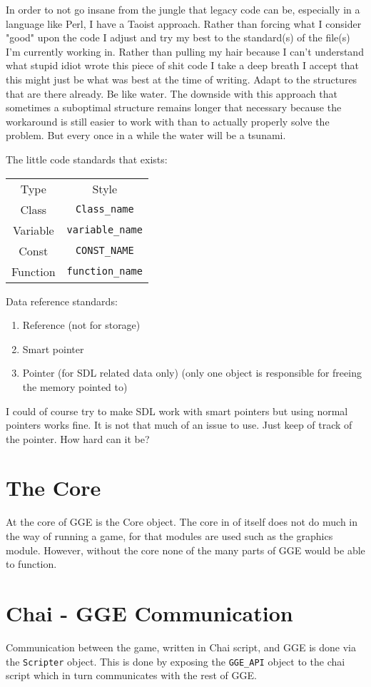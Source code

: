 \documentclass{article}
\begin{document}
In order to not go insane from the jungle that legacy code can be, especially in a language like Perl, I have a Taoist approach.
Rather than forcing what I consider "good" upon the code I adjust and try my best to the standard(s) of the file(s) I'm currently working in.
Rather than pulling my hair because I can't understand what stupid idiot wrote this piece of shit code I take a deep breath I accept that this might just be what was best at the time of writing. 
Adapt to the structures that are there already.
Be like water.
The downside with this approach that sometimes a suboptimal structure remains longer that necessary because the workaround is still easier to work with than to actually properly solve the problem. 
But every once in a while the water will be a tsunami.

The little code standards that exists:
\begin{tabular}{c|c}
	Type & Style \\
	Class & \verb|Class_name| \\
	Variable & \verb|variable_name| \\
	Const & \verb|CONST_NAME| \\
	Function & \verb|function_name| 
\end{tabular}

Data reference standards:
\begin{enumerate}
	\item Reference (not for storage)
	\item Smart pointer
	\item Pointer (for SDL related data only) (only one object is responsible for freeing the memory pointed to)
\end{enumerate}
I could of course try to make SDL work with smart pointers but using normal pointers works fine. It is not that much of an issue to use. Just keep of track of the pointer. How hard can it be?

\section{The Core}
At the core of GGE is the Core object. The core in of itself does not do much in the way of running a game, for that
modules are used such as the graphics module. However, without the core none of the many parts of GGE would be able
to function.

\section{Chai - GGE Communication}
Communication between the game, written in Chai script, and GGE is done via the \verb|Scripter| object. 
This is done by exposing the \verb|GGE_API| object to the chai script which in turn communicates with the rest of
GGE.
\end{document}
